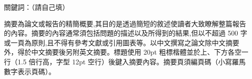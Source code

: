 \begin{ZhAbstract}
    \begin{ZhAbstractItems}
        \noindent \text 關鍵詞：（請自己填）

    \end{ZhAbstractItems}

    \begin{ZhAbstractDescription}
        摘要為論文或報告的精簡概要,其目的是透過簡短的敘述使讀者大致瞭解整篇報告的內容。摘要的內容通常須包括問題的描述以及所得到的結果,但以不超過 500 字或一頁為原則,且不得有參考文獻或引用圖表等。以中文撰寫之論文除中文摘要外，得於中文摘要後另附英文摘要。標題使用 20pt 粗標楷體並於上、下方各空一行（1.5 倍行高，字型 12pt 空行）後鍵入摘要內容。摘要頁須編頁碼（小寫羅馬數字表示頁碼）。
    \end{ZhAbstractDescription}
    
\end{ZhAbstract}

